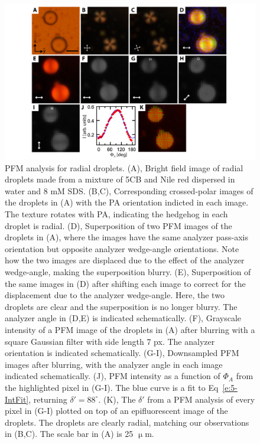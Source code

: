 \begin{figure}
  \centering
  \includegraphics{figures/C5/Ch5-Figs_PFM_Spheres.png}
  \caption{PFM analysis for radial droplets.
  (A), Bright field image of radial droplets made from a mixture of 5CB and Nile red dispersed in water and 8 mM SDS.
  (B,C), Corresponding crossed-polar images of the droplets in (A) with the PA orientation indicted in each image.
  The texture rotates with PA, indicating the hedgehog in each droplet is radial.
  (D), Superposition of two PFM images of the droplets in (A), where the images have the same analyzer pass-axis orientation but opposite analyzer wedge-angle orientations. Note how the two images are displaced due to the effect of the analyzer wedge-angle, making the superposition blurry.
  (E), Superposition of the same images in (D) after shifting each image to correct for the displacement due to the analyzer wedge-angle. Here, the two droplets are clear and the superposition is no longer blurry.
  The analyzer angle in (D,E) is indicated schematically.
  (F), Grayscale intensity of a PFM image of the droplets in (A) after blurring with a square Gaussian filter with side length 7 px.
  The analyzer orientation is indicated schematically.
  (G-I), Downsampled PFM images after blurring, with the analyzer angle in each image indicated schematically.
  (J), PFM intensity as a function of $\Phi_A$ from the highlighted pixel in (G-I).
  The blue curve is a fit to Eq~\ref{e:5-IntFit}, returning $\delta' = 88^{\circ}$.
  (K), The $\delta'$ from a PFM analysis of every pixel in (G-I) plotted on top of an epifluorescent image of the droplets.
  The droplets are clearly radial, matching our observations in (B,C).
  The scale bar in (A) is 25 $\upmu$m.}\label{f:5-PFM_Spheres}
\end{figure}

